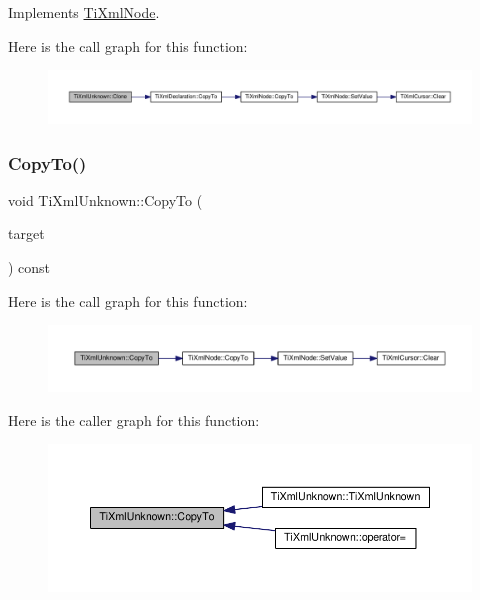 Implements \hyperlink{class_ti_xml_node_a4508cc3a2d7a98e96a54cc09c37a78a4}{Ti\+Xml\+Node}.

Here is the call graph for this function\+:\nopagebreak
\begin{figure}[H]
\begin{center}
\leavevmode
\includegraphics[width=350pt]{class_ti_xml_unknown_a3dea7689de5b1931fd6657992948fde0_cgraph}
\end{center}
\end{figure}
\mbox{\label{class_ti_xml_unknown_afeb334446bcbe13ce15131e1629712be}} 
\subsubsection{\texorpdfstring{Copy\+To()}{CopyTo()}}
{\footnotesize\ttfamily void Ti\+Xml\+Unknown\+::\+Copy\+To (\begin{DoxyParamCaption}\item[{\hyperlink{class_ti_xml_unknown}{Ti\+Xml\+Unknown} $\ast$}]{target }\end{DoxyParamCaption}) const\hspace{0.3cm}{\ttfamily [protected]}}

Here is the call graph for this function\+:\nopagebreak
\begin{figure}[H]
\begin{center}
\leavevmode
\includegraphics[width=350pt]{class_ti_xml_unknown_afeb334446bcbe13ce15131e1629712be_cgraph}
\end{center}
\end{figure}
Here is the caller graph for this function\+:\nopagebreak
\begin{figure}[H]
\begin{center}
\leavevmode
\includegraphics[width=350pt]{class_ti_xml_unknown_afeb334446bcbe13ce15131e1629712be_icgraph}
\end{center}
\end{figure}
\mbox{\label{class_ti_xml_unknown_a60560b5aacb4bdc8b2b5f02f0a99c5c0}} 
